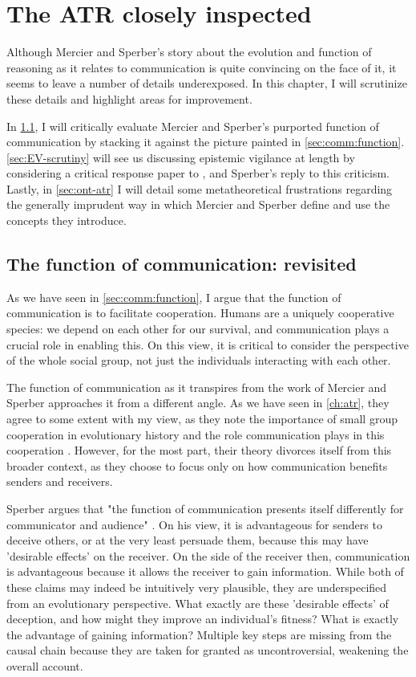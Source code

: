 \chapter{The ATR closely inspected}
\label{ch:scrutiny}

Although Mercier and Sperber's story about the evolution and function of reasoning as it relates to communication is quite convincing on the face of it, it seems to leave a number of details underexposed. In this chapter, I will scrutinize these details and highlight areas for improvement.

In \cref{sec:comm-func-scrutiny}, I will critically evaluate Mercier and Sperber's purported function of communication by stacking it against the picture painted in \cref{sec:comm:function}.
\cref{sec:EV-scrutiny} will see us discussing epistemic vigilance at length by considering a critical response paper to \citet{Sperber10}, and Sperber's reply to this criticism.
Lastly, in \cref{sec:ont-atr} I will detail some metatheoretical frustrations regarding the generally imprudent way in which Mercier and Sperber define and use the concepts they introduce.

\section{The function of communication: revisited}
\label{sec:comm-func-scrutiny}

As we have seen in \cref{sec:comm:function}, I argue that the function of communication is to facilitate cooperation. Humans are a uniquely cooperative species: we depend on each other for our survival, and communication plays a crucial role in enabling this. On this view, it is critical to consider the perspective of the whole social group, not just the individuals interacting with each other.

The function of communication as it transpires from the work of Mercier and Sperber approaches it from a different angle.
As we have seen in \cref{ch:atr}, they agree to some extent with my view, as they note the importance of small group cooperation in evolutionary history and the role communication plays in this cooperation \citep[p.~60]{MS11}.
However, for the most part, their theory divorces itself from this broader context, as they choose to focus only on how communication benefits senders and receivers.

Sperber argues that "the function of communication presents itself differently for communicator and audience" \citep[p.~411]{Sperber01}. On his view, it is advantageous for senders to deceive others, or at the very least persuade them, because this may have 'desirable effects' on the receiver. On the side of the receiver then, communication is advantageous because it allows the receiver to gain information.
While both of these claims may indeed be intuitively very plausible, they are underspecified from an evolutionary perspective. What exactly are these 'desirable effects' of deception, and how might they improve an individual's fitness? What is exactly the advantage of gaining information? Multiple key steps
are missing from the causal chain because they are taken for granted as uncontroversial, weakening the overall account.

